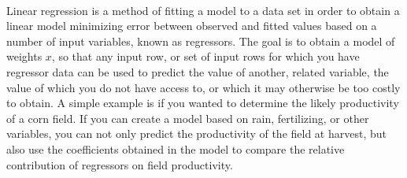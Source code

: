 \label{app:supp}
\paragraph{}
Linear regression is a method of fitting a model to a data set in order to obtain a linear model minimizing error between observed and fitted values based on a number of input variables, known as regressors. The goal is to obtain a model of weights $x$, so that any input row, or set of input rows for which you have regressor data can be used to predict the value of another, related variable, the value of which you do not have access to, or which it may otherwise be too costly to obtain. A simple example is if you wanted to determine the likely productivity of a corn field. If you can create a model based on rain, fertilizing, or other variables, you can not only predict the productivity of the field at harvest, but also use the coefficients obtained in the model to compare the relative contribution of regressors on field productivity.


